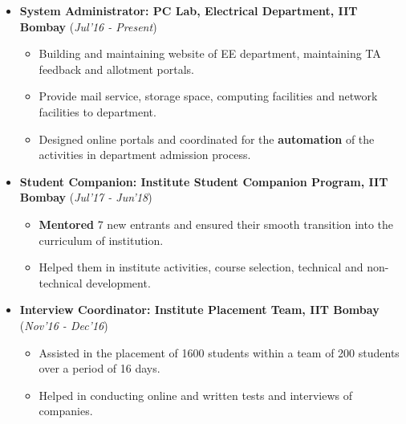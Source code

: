 \documentclass[10pt]{article}
\begin{document}
\begin{itemize}[leftmargin=0.4cm]
\vspace{-0.1cm}
\item \textbf {System Administrator: PC Lab, Electrical Department, IIT Bombay} 
\hfill{(\textit{Jul'16 - Present})}\\[-0.6cm]
    \begin{itemize}
	\item Building and maintaining website of EE department, maintaining TA feedback and allotment portals.\vspace{-0.1cm}
	\item Provide mail service, storage space, computing facilities and network facilities to department.\vspace{-0.1cm}
	\item Designed online portals and coordinated for the \textbf{automation} of the activities in department admission process.
	\end{itemize}
	\vspace{-0.25cm}
	
	
\item \textbf{Student Companion: Institute Student Companion Program, IIT Bombay}
\hfill{(\textit{Jul'17 - Jun'18})}\\[-0.6cm]
    \begin{itemize}
			\item \textbf{Mentored} 7 new entrants and ensured their smooth transition into the curriculum of institution.\vspace{-0.1cm}
            \item Helped them in institute activities, course selection, technical and non-technical development.
		\end{itemize}
		\vspace{-0.25cm}
	
\item \textbf{Interview Coordinator: Institute Placement Team, IIT Bombay}
\hfill{(\textit{Nov'16 - Dec'16})}\\[-0.6cm]
    \begin{itemize}
            \item Assisted in the placement of 1600 students within a team of 200 students over a period of 16 days.\vspace{-0.1cm}
            \item Helped in conducting online and written tests and interviews of companies.
		\end{itemize}
		\vspace{-0.25cm}	



\end{itemize}
\end{document}
